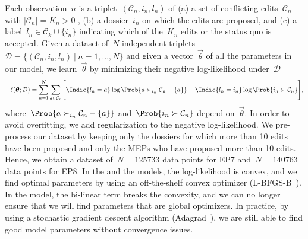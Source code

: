 Each observation~$n$ is a triplet~$( \mathcal{C}_n, i_n, l_n )$ of (a) a set of conflicting edits~$\mathcal{C}_n$ with $| \mathcal{C}_n | = K_n > 0$ , (b) a dossier~$i_n$ on which the edits are proposed, and (c) a label~$l_n \in \mathcal{C}_k \cup \{ i_n \}$ indicating which of the~$K_n$ edits or the status quo is accepted.
Given a dataset of~$N$ independent triplets \mbox{$\mathcal{D} = \{ ( \mathcal{C}_n, i_n, l_n )~\vert~n = 1, ..., N \}$} and given a vector~$\vec{\theta}$ of all the parameters in our model, we learn~$\vec{\theta}$ by minimizing their negative log-likelihood under~$\mathcal{D}$
\begin{equation*}
	- \ell(\vec{\theta} ; \mathcal{D})
	= \sum_{n = 1}^N  \sum_{a \in \mathcal{C}_n} \Biggl[ \Indic{l_n = a} \log \Prob{a \succ_{i_n} \mathcal{C}_n - \{ a \} }
  + \Indic{l_n = i_n} \log \Prob{i_n \succ \mathcal{C}_n } \Biggr],
\end{equation*}
where~$\Prob{a \succ_{i_n} \mathcal{C}_n - \{ a \} }$ and~$\Prob{i_n \succ \mathcal{C}_n }$ depend on~$\vec{\theta}$.
In order to avoid overfitting, we add regularization to the negative log-likelihood.
We pre-process our dataset by keeping only the dossiers for which more than 10 edits have been proposed and only the MEPs who have proposed more than 10 edits.
Hence, we obtain a dataset of~$N=125733$ data points for EP7 and~$N=140763$ data points for EP8.
In the  and the  models, the log-likelihood is convex, and we find optimal parameters by using an off-the-shelf convex optimizer (L-BFGS-B~\cite{byrd1995limited}).
In the  model, the bi-linear term breaks the convexity, and we can no longer ensure that we will find parameters that are global optimizers.
In practice, by using a stochastic gradient descent algorithm (Adagrad~\cite{duchi2011adaptive}), we are still able to find good model parameters without convergence issues.

